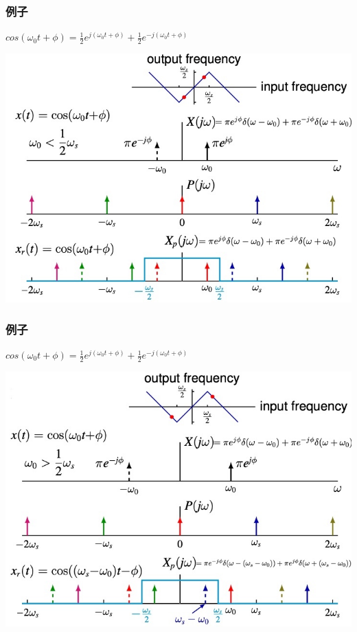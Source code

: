 \documentclass[CJKutf8,xcolor=pdftex,dvipsnames,table]{beamer}
\begin{document}
\begin{CJK*}{UTF8}{song}
\begin{frame}
  \end{frame}   

  \begin{frame}
    \frametitle{例子}
	$cos(\omega_0 t + \phi) = \frac{1}{2}e^{j(\omega_0 t+ \phi)}+\frac{1}{2}e^{-j(\omega_0 t+ \phi)}	$

    \begin{center}
    \includegraphics[scale=.42]{aliasing-example-2}
    \end{center}

  \end{frame}   
  
  \begin{frame}
    \frametitle{例子}
	$cos(\omega_0 t + \phi) = \frac{1}{2}e^{j(\omega_0 t+ \phi)}+\frac{1}{2}e^{-j(\omega_0 t+ \phi)}	$

    \begin{center}
    \includegraphics[scale=.42]{aliasing-example-3}
    \end{center}


\end{frame}
\end{CJK*}
\end{document}
